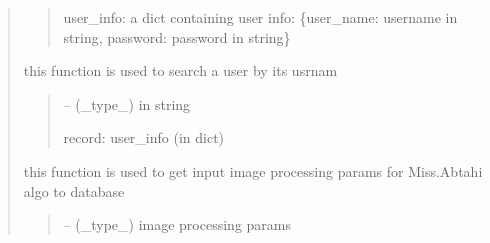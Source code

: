 \documentclass[letterpaper,10pt,english]{sphinxmanual}
\begin{document}
\begin{quote}
\begin{savenotes}
\begin{fulllineitems}
\begin{savenotes}
\begin{fulllineitems}
\begin{quote}
\begin{description}
\sphinxAtStartPar
user\_info: a dict containing user info:
\{user\_name: username in string, password: password in string\}

\end{description}\end{quote}

\end{fulllineitems}\end{savenotes}


\begin{savenotes}\begin{fulllineitems}
\label{\detokenize{setting/database_utils:oxin.database_utils.dataBaseUtils.search_user_by_user_name}}
\pysigstartsignatures
{}
\pysigstopsignatures
\sphinxAtStartPar
this function is used to search a user by its usrnam
\begin{quote}\begin{description}
\sphinxAtStartPar
{} – (\_type\_) in string

\sphinxAtStartPar
record: user\_info (in dict)

\end{description}\end{quote}

\end{fulllineitems}\end{savenotes}


\begin{savenotes}\begin{fulllineitems}
\label{\detokenize{setting/database_utils:oxin.database_utils.dataBaseUtils.set_image_processing_parms}}
\pysigstartsignatures
{}
\pysigstopsignatures
\sphinxAtStartPar
this function is used to get input image processing params for Miss.Abtahi algo to database
\begin{quote}\begin{description}
\sphinxAtStartPar
{} – (\_type\_) image processing params


\end{description}
\end{quote}
\end{fulllineitems}
\end{savenotes}
\end{fulllineitems}
\end{savenotes}
\end{quote}
\end{document}
